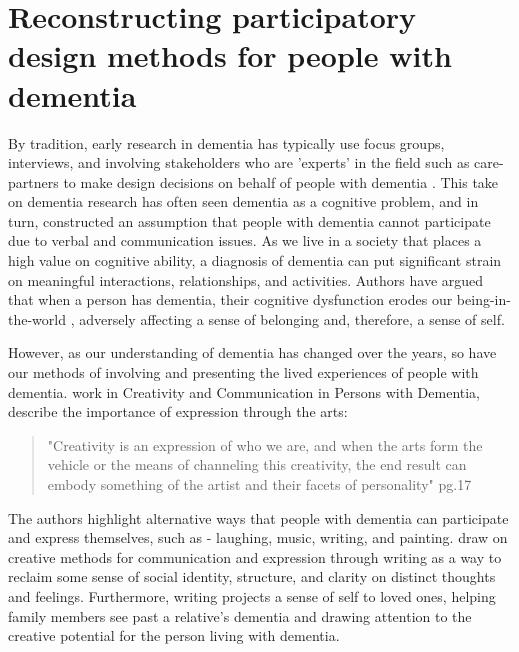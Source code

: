 \section{Reconstructing participatory design methods for people with dementia}
\label{method:DementiaPD}
By tradition, early research in dementia has typically use focus groups, interviews, and involving stakeholders who are 'experts' in the field such as care-partners to make design decisions on behalf of people with dementia \citep{branco_personalised_2017}. This take on dementia research has often seen dementia as a cognitive problem, and in turn, constructed an assumption that people with dementia cannot participate due to verbal and communication issues. As we live in a society that places a high value on cognitive ability, a diagnosis of dementia can put significant strain on meaningful interactions, relationships, and activities. Authors have argued that when a person has dementia, their cognitive dysfunction erodes our being-in-the-world \citep{hampson_dementia:_2016}, adversely affecting a sense of belonging and, therefore, a sense of self.

However, as our understanding of dementia has changed over the years, so have our methods of involving and presenting the lived experiences of people with dementia. \cite{john_killick_claire_craig_creativity_2012} work in Creativity and Communication in Persons with Dementia, describe the importance of expression through the arts: 

\begin{quote}
"Creativity is an expression of who we are, and when the arts form the vehicle or the means of channeling this creativity, the end result can embody something of the artist and their facets of personality" \cite{john_killick_claire_craig_creativity_2012} pg.17
\end{quote}

The authors highlight alternative ways that people with dementia can participate and express themselves, such as - laughing, music, writing, and painting. \cite{ryan_dementia_2009} draw on creative methods for communication and expression through writing as a way to reclaim some sense of social identity, structure, and clarity on distinct thoughts and feelings. Furthermore, writing projects a sense of self to loved ones, helping family members see past a relative's dementia and drawing attention to the creative potential for the person living with dementia. 

